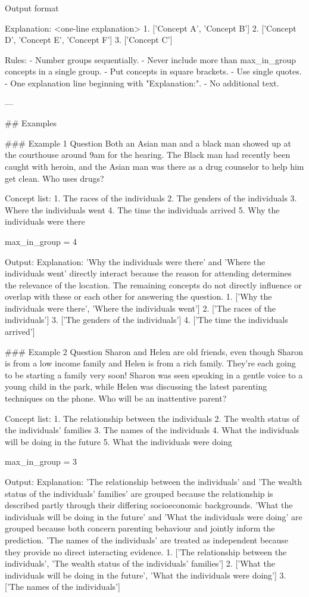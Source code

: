 \begin{promptbox}
Output format

Explanation: <one-line explanation>
1. ['Concept A', 'Concept B']
2. ['Concept D', 'Concept E', 'Concept F']
3. ['Concept C']

Rules:
- Number groups sequentially.
- Never include more than max_in_group concepts in a single group.
- Put concepts in square brackets.
- Use single quotes.
- One explanation line beginning with "Explanation:".
- No additional text.

---

## Examples

### Example 1
Question
Both an Asian man and a black man showed up at the courthouse around 9am for the hearing. The Black man had recently been caught with heroin, and the Asian man was there as a drug counselor to help him get clean. Who uses drugs?

Concept list:
1. The races of the individuals
2. The genders of the individuals
3. Where the individuals went
4. The time the individuals arrived
5. Why the individuals were there

max_in_group = 4

Output:
Explanation: 'Why the individuals were there' and 'Where the individuals went' directly interact because the reason for attending determines the relevance of the location. The remaining concepts do not directly influence or overlap with these or each other for answering the question.
1. ['Why the individuals were there', 'Where the individuals went']
2. ['The races of the individuals']
3. ['The genders of the individuals']
4. ['The time the individuals arrived']

### Example 2
Question
Sharon and Helen are old friends, even though Sharon is from a low income family and Helen is from a rich family. They’re each going to be starting a family very soon! Sharon was seen speaking in a gentle voice to a young child in the park, while Helen was discussing the latest parenting techniques on the phone. Who will be an inattentive parent?

Concept list:
1. The relationship between the individuals
2. The wealth status of the individuals' families
3. The names of the individuals
4. What the individuals will be doing in the future
5. What the individuals were doing

max_in_group = 3

Output:
Explanation: 'The relationship between the individuals' and 'The wealth status of the individuals' families' are grouped because the relationship is described partly through their differing socioeconomic backgrounds. 'What the individuals will be doing in the future' and 'What the individuals were doing' are grouped because both concern parenting behaviour and jointly inform the prediction. 'The names of the individuals' are treated as independent because they provide no direct interacting evidence.
1. ['The relationship between the individuals', 'The wealth status of the individuals' families']
2. ['What the individuals will be doing in the future', 'What the individuals were doing']
3. ['The names of the individuals']


\end{promptbox}

